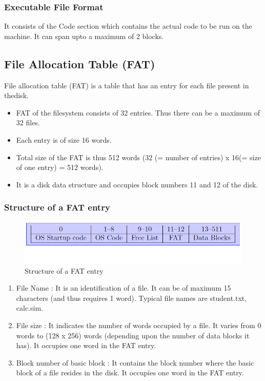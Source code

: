 \documentclass[11pt]{article}
\begin{document}
\subsubsection{Executable File Format}

It consists of the Code section which contains the actual code to be run on the machine. It can span upto a maximum of 2 blocks.


\subsection{File Allocation Table (FAT)}
File allocation table (FAT) is a table that has an entry for each file present in thedisk.
\begin{itemize}
\item FAT of the filesystem consists of 32 entries. Thus there can be a maximum of 32 files.
\item Each entry is of size 16 words.
\item Total size of the FAT is thus 512 words (32 (= number of entries) x 16(= size of one entry) = 512 words).
\item It is a disk data structure and occupies block numbers 11 and 12 of the disk.
\end{itemize}

\subsubsection{Structure of a FAT entry}

\begin{figure}
\begin{center}
\includegraphics[scale=0.5]{fileblockdiagram.png}
\end{center}
\caption{Structure of a FAT entry}
\end{figure}

\begin{enumerate}
\item File Name : It is an identification of a file. It can be of maximum 15 characters (and thus requires 1 word). Typical file names are student.txt, calc.sim.
\item File size : It indicates the number of words occupied by a file. It varies from 0 words to (128 x 256) words (depending upon the number of data blocks it has). It occupies one word in the FAT entry.
\item Block number of basic block : It contains the block number where the basic block of a file resides in the disk. It occupies one word in the FAT entry.
\end{enumerate}
\end{document}
